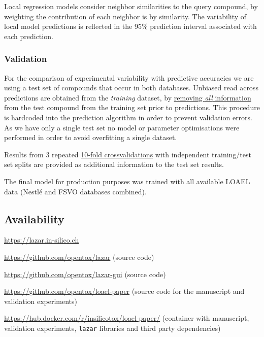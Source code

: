 \documentclass[]{achemso}
\providecommand{\tightlist}{%
  \setlength{\itemsep}{0pt}\setlength{\parskip}{0pt}}
\begin{document}
Local regression models consider neighbor similarities to the query
compound, by weighting the contribution of each neighbor is by
similarity. The variability of local model predictions is reflected in
the 95\% prediction interval associated with each prediction.

\subsubsection{Validation}\label{validation}

For the comparison of experimental variability with predictive
accuracies we are using a test set of compounds that occur in both
databases. Unbiased read across predictions are obtained from the
\emph{training} dataset, by
\href{https://github.com/opentox/lazar/blob/loael-paper.submission/lib/model.rb\#L234-L238}{removing
\emph{all} information} from the test compound from the training set
prior to predictions. This procedure is hardcoded into the prediction
algorithm in order to prevent validation errors. As we have only a
single test set no model or parameter optimisations were performed in
order to avoid overfitting a single dataset.

Results from 3 repeated
\href{https://github.com/opentox/lazar/blob/loael-paper.submission/lib/crossvalidation.rb\#L85-L93}{10-fold
crossvalidations} with independent training/test set splits are provided
as additional information to the test set results.

The final model for production purposes was trained with all available
LOAEL data (Nestlé and FSVO databases combined).

\subsection{Availability}\label{availability}

\begin{description}
\tightlist
\item[Public webinterface]
\url{https://lazar.in-silico.ch}
\item[\texttt{lazar} framework]
\url{https://github.com/opentox/lazar} (source code)
\item[\texttt{lazar} GUI]
\url{https://github.com/opentox/lazar-gui} (source code)
\item[Manuscript]
\url{https://github.com/opentox/loael-paper} (source code for the
manuscript and validation experiments)
\item[Docker image]
\url{https://hub.docker.com/r/insilicotox/loael-paper/} (container with
manuscript, validation experiments, \texttt{lazar} libraries and third
party dependencies)
\end{description}
\end{document}
